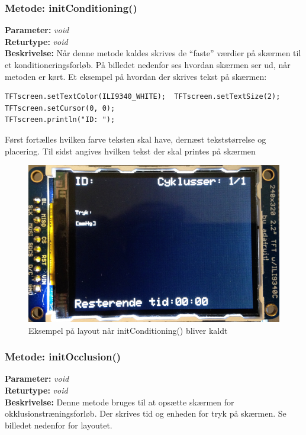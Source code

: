 \subsubsection{Metode: initConditioning()}
\textbf{Parameter: } \textit{void}
\\ \textbf{Returtype: } \textit{void}
\\ \textbf{Beskrivelse: } Når denne metode kaldes skrives de “faste” værdier på skærmen til et konditioneringsforløb. På billedet nedenfor ses hvordan skærmen ser ud, når metoden er kørt. Et eksempel på hvordan der skrives tekst på skærmen: 
\begin{lstlisting}
TFTscreen.setTextColor(ILI9340_WHITE);  TFTscreen.setTextSize(2);
TFTscreen.setCursor(0, 0);
TFTscreen.println("ID: ");
\end{lstlisting}
Først fortælles hvilken farve teksten skal have, dernæst tekststørrelse og placering. Til sidst angives hvilken tekst der skal printes på skærmen

\begin{figure}[H]
	\includegraphics[width=\textwidth]{billeder/conditioning.png}
	\caption{Eksempel på layout når initConditioning() bliver kaldt}\label{pic:conditiong}
\end{figure}

\subsubsection{Metode: initOcclusion()}
\textbf{Parameter: } \textit{void}
\\ \textbf{Returtype: } \textit{void}
\\ \textbf{Beskrivelse: }  Denne metode bruges til at opsætte skærmen for okklusionstræningsforløb. Der skrives tid og enheden for tryk på skærmen. Se billedet nedenfor for layoutet. 

